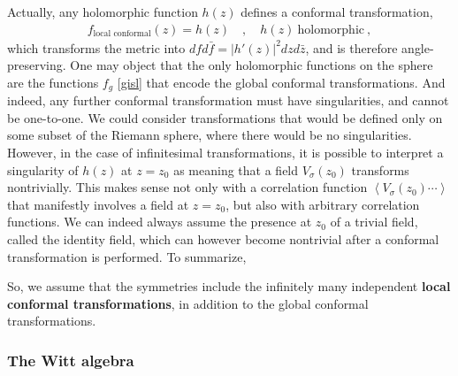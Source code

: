 \documentclass[12pt, a4paper, notitlepage, twoside]{report}
\numberwithin{equation}{section}
\theoremstyle{break}
\begin{document}
Actually, any holomorphic function $h(z)$ defines a conformal transformation,
\begin{align}
 f_\text{local conformal}(z) = h(z) \quad , \quad h(z)\ \text{holomorphic}\ , 
\label{flc}
\end{align}
which transforms the metric into $dfd\bar{f} = |h'(z)|^2 dzd\bar{z}$, and is therefore angle-preserving.
One may object that the only holomorphic functions on the sphere are the functions $f_g$ \eqref{gisl} that encode the global conformal transformations.
And indeed, any further conformal transformation must have singularities, and cannot be one-to-one.
We could consider transformations that would be defined only on some subset of the Riemann sphere, where there would be no singularities.
However, in the case of infinitesimal transformations, it is possible to interpret a singularity of $h(z)$ at $z=z_0$ as meaning that a field $V_\sigma(z_0)$ transforms nontrivially.
This makes sense not only with a correlation function $\left\langle V_{\sigma}(z_0)\cdots \right\rangle $ that manifestly involves a field at $z=z_0$, 
but also with arbitrary correlation functions.
We can indeed always assume the presence at $z_0$ of a trivial field, called the identity field, which can however become nontrivial after a conformal transformation is performed.
To summarize,
\begin{center}
\end{center}
So, we assume that the symmetries include the infinitely many independent \textbf{\boldmath local conformal transformations}, in addition to the global conformal transformations.

\subsubsection{The Witt algebra}
\end{document}
